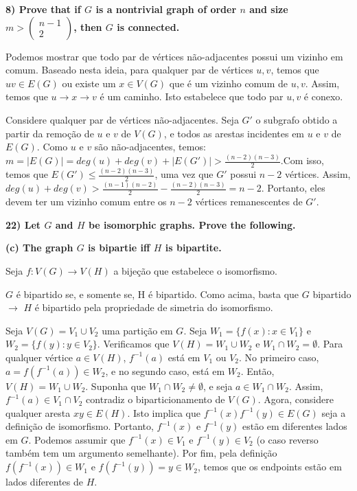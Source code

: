 \documentclass[]{article}
\begin{document}
\newpage

\noindent \textbf{8) Prove that if $G$ is a nontrivial graph of order $n$ and size $m > \left( \begin{array}{c} n-1 \\ 2 \end{array} \right)$, then $G$ is connected.}

Podemos mostrar que todo par de vértices não-adjacentes possui um vizinho em comum. Baseado nesta ideia, para qualquer par de vértices $u, v$, temos que $uv \in E(G)$ ou existe um $x \in V(G)$ que é um vizinho comum de $u, v$. Assim, temos que $u \rightarrow x \rightarrow v$ é um caminho. Isto estabelece que todo par $u, v$ é conexo.

Considere qualquer par de vértices não-adjacentes. Seja $G'$ o subgrafo obtido a partir da remoção de $u$ e $v$ de $V(G)$, e todos as arestas incidentes em $u$ e $v$ de $E(G)$. Como $u$ e $v$ são não-adjacentes, temos: $m = |E(G)| = deg(u) + deg(v) + |E(G')| > \frac{(n-2)(n-3)}{2}$.Com isso, temos que $E(G') \leq \frac{(n-2)(n-3)}{2}$, uma vez que $G'$ possui $n-2$ vértices. Assim, $deg(u) + deg(v) > \frac{(n-1)(n-2)}{2} - \frac{(n-2)(n-3)}{2} = n-2$. Portanto, eles devem ter um vizinho comum entre os $n-2$ vértices remanescentes de $G'$.

\newpage

\noindent \textbf{22) Let $G$ and $H$ be isomorphic graphs. Prove the following.}

\noindent \textbf{(c) The graph $G$ is bipartie iff $H$ is bipartite.}

Seja $f: V(G) \rightarrow V(H)$ a bijeção que estabelece o isomorfismo.

$G$ é bipartido se, e somente se, H é bipartido. Como acima, basta que $G$ bipartido $\rightarrow$ $H$ é bipartido pela propriedade de simetria do isomorfismo. 

Seja $V(G) = V_1 \cup V_2$ uma partição em $G$. Seja $W_1 = \{f(x): x \in V_1\}$ e $W_2 = \{f(y): y \in V_2\}$. Verificamos que $V(H) = W_1 \cup W_2$ e $W_1 \cap W_2 = \emptyset$. Para qualquer vértice $a \in V(H)$, $f^{-1}(a)$ está em $V_1$ ou $V_2$. No primeiro caso, $a = f(f^{-1}(a)) \in W_2$, e no segundo caso, está em $W_2$. Então, $V(H) = W_1 \cup W_2$. Suponha que $W_1 \cap W_2 \neq \emptyset$, e seja $a \in W_1 \cap W_2$. Assim, $f^{-1}(a) \in V_1 \cap V_2$ contradiz o biparticionamento de $V(G)$. Agora, considere qualquer aresta $xy \in E(H)$. Isto implica que $f^{-1}(x) f^{-1}(y) \in E(G)$ seja a definição de isomorfismo. Portanto, $f^{-1}(x)$ e $f^{-1}(y)$ estão em diferentes lados em $G$. Podemos assumir que $f^{-1}(x) \in V_1$ e $f^{-1}(y) \in V_2$ (o caso reverso também tem um argumento semelhante). Por fim, pela definição $f(f^{-1}(x)) \in W_1$ e $f(f^{-1}(y)) = y \in W_2$, temos que os endpoints estão em lados diferentes de $H$.
\end{document}
